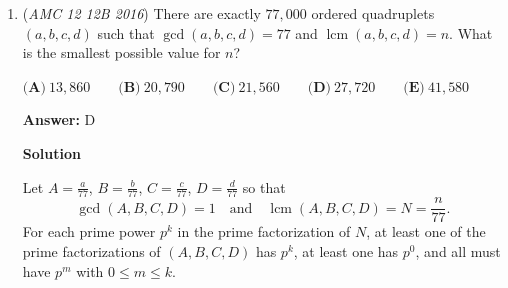 \begin{enumerate}
 



\textbf{Solution 2 (Calculus)}

Let $z\rightarrow z-1/2$, then we can transform the two inequalities to $|x|+|y|+|z-1/2|\le1$ and $|x|+|y|+|z+1/2|\le1$. Then it's clear that $-1/2\le z \le 1/2$, consider $0 \le z \le 1/2$, $|x|+|y|\le 1/2-z$, then since the area of $|x|+|y|\le k$ is $2k^2$, the volume is $\int_{0}^{1/2}2k^2 \,dk=\frac{1}{12}$. By symmetry, the case when $\frac{-1}{2}\le z\le0$ is the same. Thus the answer is $\frac{1}{6}$.

 



\textbf{Solution 3}

Do this problem first on the first quadrant. Graph this by using test points and you will see that you will have two tetrahedrons - each of them intersects at the middle, and thus its $1/4$th of the area of the tetrahedrons (since they are the same area). The area of a tetrahedron is bh/3, which gives us $1/6$, and then divide that by $4$ to get the bounded area of $1/24$ in the shaded region. Scale this up to the other quadrants now (since they are the same due to the abs value) and you get $\textbf{(A) }\frac16$.

 Sol by IronicNinja~

 $\textbf{Note:}$ The way I solved this problem is by considering the intersections of the bottom half of the shifted figure with the original figure. This basically motivated the fact that, because the intersection is symmetrical, it is a smaller of scale $\frac{1}{2}$, which finishes the problem.

 


	\item (\textit{AMC 12 12B 2016}) There are exactly $77,000$ ordered quadruplets $(a, b, c, d)$ such that $\gcd(a, b, c, d) = 77$ and $\operatorname{lcm}(a, b, c, d) = n$. What is the smallest possible value for $n$?


 $\textbf{(A)}\ 13,860\qquad\textbf{(B)}\ 20,790\qquad\textbf{(C)}\ 21,560 \qquad\textbf{(D)}\ 27,720 \qquad\textbf{(E)}\ 41,580$

 \textbf{Answer: }D



\textbf{Solution}

Let $A=\frac{a}{77}$, $B=\frac{b}{77}$, $C=\frac{c}{77}$, $D=\frac{d}{77}$ so that
 \[\gcd(A,B,C,D)=1 \quad \text{and} \quad \operatorname{lcm}(A,B,C,D) = N = \frac{n}{77}.\]For each prime power $p^k$ in the prime factorization of $N$, at least one of the prime factorizations of $(A,B,C,D)$ has $p^k$, at least one has $p^0$, and all must have $p^m$ with $0\le m\le k$.


\end{enumerate}
